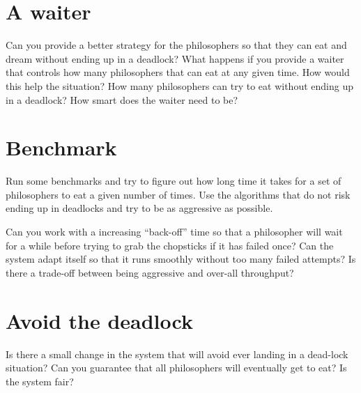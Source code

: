 \documentclass[a4paper,11pt]{article}
\begin{document}
    \section{A waiter}
    
    Can you provide a better strategy for the philosophers so that they
    can eat and dream without ending up in a deadlock? What happens if
    you provide a waiter that controls how many philosophers that can eat
    at any given time. How would this help the situation? How many
    philosophers can try to eat without ending up in a deadlock? How
    smart does the waiter need to be?
    
    
    
    \section{Benchmark}
    
    Run some benchmarks and try to figure out how long time it takes for a
    set of philosophers to eat a given number of times. Use the algorithms
    that do not risk ending up in deadlocks and try to be as aggressive as
    possible.  
    
    Can you work with a increasing ``back-off'' time so that a philosopher
    will wait for a while before trying to grab the chopsticks if it has
    failed once? Can the system adapt itself so that it runs smoothly
    without too many failed attempts? Is there a trade-off between being
    aggressive and over-all throughput?
    
    
    
    \section{Avoid the deadlock}
    
    Is there a small change in the system that will avoid ever landing in
    a dead-lock situation? Can you guarantee that all philosophers will
    eventually get to eat? Is the system fair?
    
    
\end{document}
